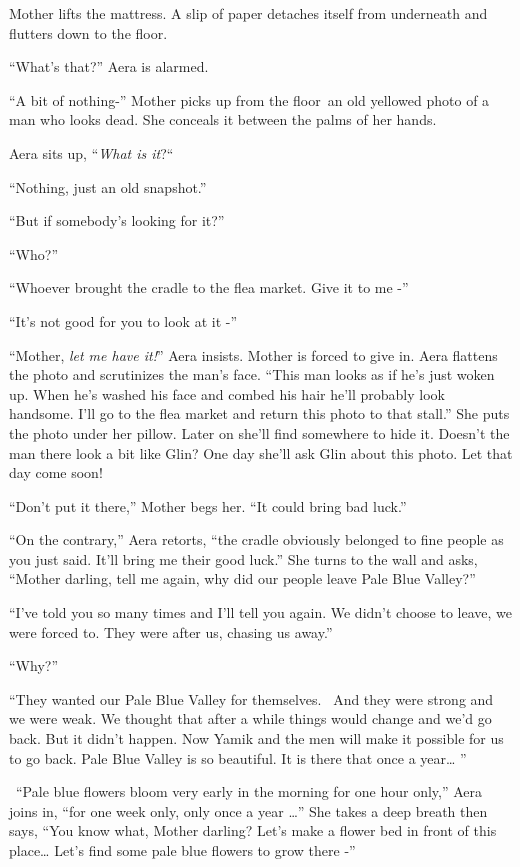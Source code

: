 \documentclass[twoside,11pt]{book}
\begin{document}
Mother lifts the mattress. A slip of paper detaches itself from underneath and{ }flutters down to the
floor.

``What's that?'' Aera is alarmed.

``A bit of nothing-'' Mother picks up from the floor~an old yellowed photo of a man who looks
dead. She conceals{ }it between the palms of her hands.

Aera sits up, ``\textit{What is it}?``~

``Nothing, just an old snapshot.''

``But if somebody's looking for it?''

``Who?''

``Whoever brought the cradle to the flea market. Give it to me -''

``It's not good for you to look at it -''

``Mother, \textit{let me have it!}'' Aera insists. Mother is forced to give in. Aera flattens
the photo and scrutinizes the man's face. ``This man looks as if he's just woken up. When he's washed his
face and combed his hair he'll probably look handsome. I'll go to the flea market and return this photo to that
stall.'' She puts the photo under her pillow. Later on she'll find somewhere to hide it. Doesn't the man
there look a bit like Glin? One day she'll ask Glin about this photo. Let that day come soon!

``Don't put it there,'' Mother begs her. ``It could bring bad
luck.''

``On the contrary,'' Aera retorts, ``the cradle obviously belonged to fine people
as you just said. It'll bring me their good luck.'' She turns to the wall and asks, ``Mother
darling, tell me again, why did our people leave Pale Blue Valley?''

``I've told you so many times and I'll tell you again. We didn't choose to leave, we were forced to. They
were after us, chasing us away.''

``Why?''

``They wanted our Pale Blue Valley for themselves. ~And they were strong and we were weak. We thought that
after a while things would change and we'd go back. But it didn't happen. Now Yamik and the men will make it possible
for us to go back. Pale Blue Valley is so beautiful. It is there that once a year{\dots} ''

\ ``Pale blue flowers bloom very early in the morning for one hour only,'' Aera joins in, ``for one week
only, only once a year {\dots}'' She takes a deep breath then says, ``You know what, Mother
darling? Let's make a flower bed in front of this place{\dots} Let's find some pale blue flowers to grow there
-''
\end{document}
